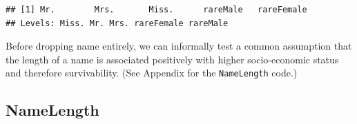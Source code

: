 \documentclass[]{article}
\newenvironment{Shaded}{\begin{snugshade}}{\end{snugshade}}
\newcommand{\KeywordTok}[1]{\textcolor[rgb]{0.13,0.29,0.53}{\textbf{#1}}}
\newcommand{\DecValTok}[1]{\textcolor[rgb]{0.00,0.00,0.81}{#1}}
\newcommand{\StringTok}[1]{\textcolor[rgb]{0.31,0.60,0.02}{#1}}
\newcommand{\CommentTok}[1]{\textcolor[rgb]{0.56,0.35,0.01}{\textit{#1}}}
\newcommand{\ControlFlowTok}[1]{\textcolor[rgb]{0.13,0.29,0.53}{\textbf{#1}}}
\newcommand{\OperatorTok}[1]{\textcolor[rgb]{0.81,0.36,0.00}{\textbf{#1}}}
\newcommand{\NormalTok}[1]{#1}
\begin{document}
\begin{Shaded}
\end{Shaded}

\begin{verbatim}
## [1] Mr.        Mrs.       Miss.      rareMale   rareFemale
## Levels: Miss. Mr. Mrs. rareFemale rareMale
\end{verbatim}

Before dropping name entirely, we can informally test a common
assumption that the length of a name is associated positively with
higher socio-economic status and therefore survivability. (See Appendix
for the \texttt{NameLength} code.)

\subsection{NameLength}\label{namelength}
\end{document}
